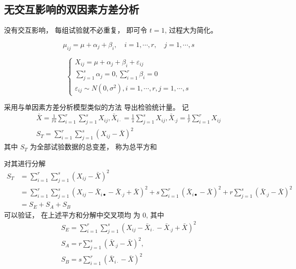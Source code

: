 \subsection{无交互影响的双因素方差分析}

没有交互影响， 每组试验就不必重复， 即可令 $  {t}={1}  $,
过程大为简化。 

\begin{equation}
\mu_{i j}=\mu+\alpha_{j}+\beta_{i}, \quad i=1, \cdots, r, \quad j=1, \cdots, s
\end{equation}

\begin{equation} \left\{\begin{array}{l}X_{i j}=\mu+\alpha_{j}+\beta_{i}+\varepsilon_{i j} \\ \sum_{j=1}^{s} \alpha_{j}=0, \sum_{i=1}^{r} \beta_{i}=0 \\ \varepsilon_{i j} \sim N\left(0, \sigma^{2}\right), i=1, \cdots, r, j=1, \cdots, s\end{array}\right. \end{equation}

采用与单因素方差分析模型类似的方法 导出检验统计量。 
记
\begin{equation}
\begin{array}{c}
\bar{X}=\frac{1}{r s} \sum_{i=1}^{r} \sum_{j=1}^{s} X_{i j}, \bar{X}_{i \cdot}=\frac{1}{s} \sum_{j=1}^{s} X_{i j}, \bar{X}_{\cdot j}=\frac{1}{r} \sum_{i=1}^{r} X_{i j} \\
S_{T}=\sum_{i=1}^{r} \sum_{j=1}^{s}\left(X_{i j}-\bar{X}\right)^{2}
\end{array}
\end{equation}
其中 $  S_{T}  $ 为全部试验数据的总变差， 称为总平方和

对其进行分解
\begin{equation}
\begin{aligned}
    S_{T}&=\sum_{i=1}^{r} \sum_{j=1}^{s}\left(X_{i j}-\bar{X}\right)^{2}\\ 
    &=\sum_{i=1}^{r} \sum_{j=1}^{s}\left(X_{i j}-\bar{X}_{i \bullet}-\bar{X}_{\cdot j}+\bar{X}\right)^{2}+s \sum_{i=1}^{r}\left(\bar{X}_{i \bullet}-\bar{X}\right)^{2}+r \sum_{j=1}^{s}\left(\bar{X}_{\cdot j}-\bar{X}\right)^{2} \\
    &=S_{E}+S_{A}+S_{B}
\end{aligned}
\end{equation}
可以验证， 在上述平方和分解中交叉项均
为 0, 其中
\begin{equation}
\begin{array}{c}
S_{E}=\sum_{i=1}^{r} \sum_{j=1}^{s}\left(X_{i j}-\bar{X}_{i \cdot}-\bar{X}_{\cdot j}+\bar{X}\right)^{2} \\
S_{A}=r \sum_{j=1}^{s}\left(\bar{X}_{\cdot j}-\bar{X}\right)^{2}, \\
S_{B}= s \sum_{i=1}^{r}\left(\bar{X}_{i \cdot}-\bar{X}\right)^{2}
\end{array}
\end{equation}

